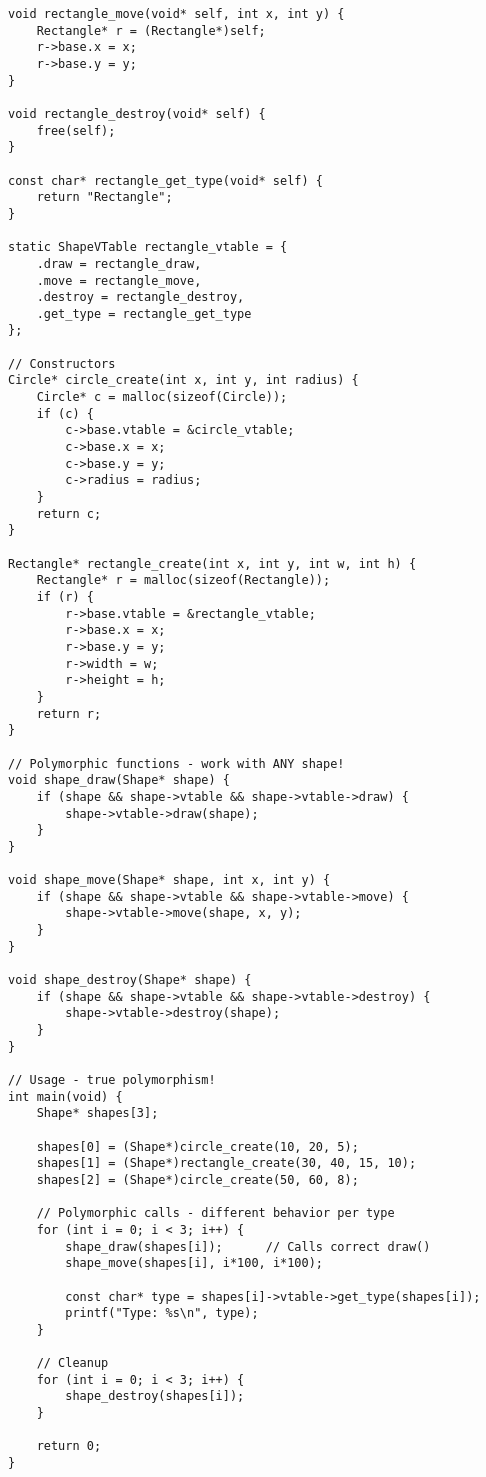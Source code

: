 \begin{lstlisting}
void rectangle_move(void* self, int x, int y) {
    Rectangle* r = (Rectangle*)self;
    r->base.x = x;
    r->base.y = y;
}

void rectangle_destroy(void* self) {
    free(self);
}

const char* rectangle_get_type(void* self) {
    return "Rectangle";
}

static ShapeVTable rectangle_vtable = {
    .draw = rectangle_draw,
    .move = rectangle_move,
    .destroy = rectangle_destroy,
    .get_type = rectangle_get_type
};

// Constructors
Circle* circle_create(int x, int y, int radius) {
    Circle* c = malloc(sizeof(Circle));
    if (c) {
        c->base.vtable = &circle_vtable;
        c->base.x = x;
        c->base.y = y;
        c->radius = radius;
    }
    return c;
}

Rectangle* rectangle_create(int x, int y, int w, int h) {
    Rectangle* r = malloc(sizeof(Rectangle));
    if (r) {
        r->base.vtable = &rectangle_vtable;
        r->base.x = x;
        r->base.y = y;
        r->width = w;
        r->height = h;
    }
    return r;
}

// Polymorphic functions - work with ANY shape!
void shape_draw(Shape* shape) {
    if (shape && shape->vtable && shape->vtable->draw) {
        shape->vtable->draw(shape);
    }
}

void shape_move(Shape* shape, int x, int y) {
    if (shape && shape->vtable && shape->vtable->move) {
        shape->vtable->move(shape, x, y);
    }
}

void shape_destroy(Shape* shape) {
    if (shape && shape->vtable && shape->vtable->destroy) {
        shape->vtable->destroy(shape);
    }
}

// Usage - true polymorphism!
int main(void) {
    Shape* shapes[3];

    shapes[0] = (Shape*)circle_create(10, 20, 5);
    shapes[1] = (Shape*)rectangle_create(30, 40, 15, 10);
    shapes[2] = (Shape*)circle_create(50, 60, 8);

    // Polymorphic calls - different behavior per type
    for (int i = 0; i < 3; i++) {
        shape_draw(shapes[i]);      // Calls correct draw()
        shape_move(shapes[i], i*100, i*100);

        const char* type = shapes[i]->vtable->get_type(shapes[i]);
        printf("Type: %s\n", type);
    }

    // Cleanup
    for (int i = 0; i < 3; i++) {
        shape_destroy(shapes[i]);
    }

    return 0;
}
\end{lstlisting}

